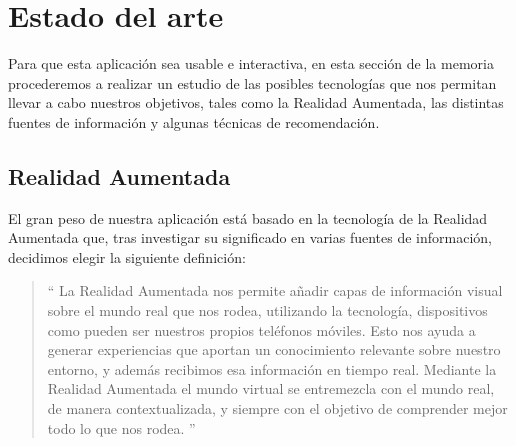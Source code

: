 
\cleardoublepage


\chapter{Estado del arte}
\label{makereference2}
Para que esta aplicación sea usable e interactiva, en esta sección de la memoria procederemos a 
realizar un estudio de las posibles tecnologías que nos permitan llevar a cabo nuestros objetivos, 
tales como la Realidad Aumentada, las distintas fuentes de información y algunas
técnicas de recomendación. 
\section{Realidad Aumentada}
\label{makereference2.1}
El gran peso de nuestra aplicación está basado en la tecnología de la Realidad
Aumentada que, tras investigar su significado en varias fuentes de información,
decidimos elegir la siguiente definición:
\begin{quote}
``
La Realidad Aumentada nos permite añadir capas de información visual sobre el 
mundo real que nos rodea, utilizando la tecnología, dispositivos como pueden ser 
nuestros propios teléfonos móviles. Esto nos ayuda a generar experiencias que aportan
un conocimiento relevante sobre nuestro entorno, y además recibimos esa información en 
tiempo real. Mediante la Realidad Aumentada el mundo virtual se entremezcla con el mundo 
real, de manera contextualizada, y siempre con el objetivo de comprender mejor todo lo que 
nos rodea.
''\cite{neosentec}
\end{quote}



